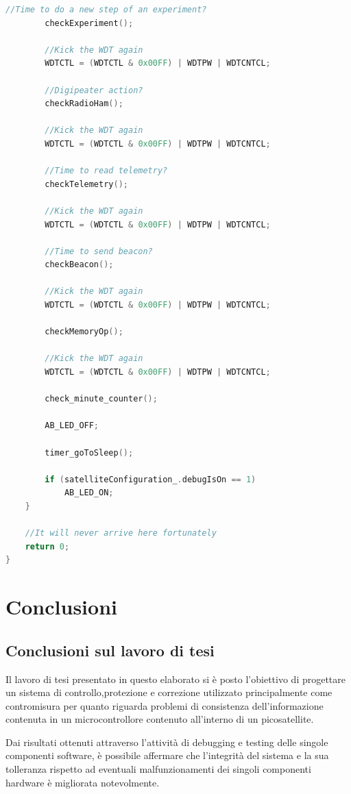 \documentclass[LaM,binding=0.6cm]{../sapthesis}
\begin{document}
\begin{small}
\begin{lstlisting}[language=C]
        //Time to do a new step of an experiment?
        checkExperiment();

        //Kick the WDT again
        WDTCTL = (WDTCTL & 0x00FF) | WDTPW | WDTCNTCL;

        //Digipeater action?
        checkRadioHam();

        //Kick the WDT again
        WDTCTL = (WDTCTL & 0x00FF) | WDTPW | WDTCNTCL;

        //Time to read telemetry?
        checkTelemetry();

        //Kick the WDT again
        WDTCTL = (WDTCTL & 0x00FF) | WDTPW | WDTCNTCL;

        //Time to send beacon?
        checkBeacon();

        //Kick the WDT again
        WDTCTL = (WDTCTL & 0x00FF) | WDTPW | WDTCNTCL;

        checkMemoryOp();

        //Kick the WDT again
        WDTCTL = (WDTCTL & 0x00FF) | WDTPW | WDTCNTCL;

        check_minute_counter();

        AB_LED_OFF;

        timer_goToSleep();

        if (satelliteConfiguration_.debugIsOn == 1)
            AB_LED_ON;
    }

    //It will never arrive here fortunately
    return 0;
}
\end{lstlisting}
\end{small}



\chapter{Conclusioni}

\section{Conclusioni sul lavoro di tesi}

Il lavoro di tesi presentato in questo elaborato si è posto l'obiettivo di progettare un sistema di controllo,protezione e correzione
utilizzato principalmente come contromisura per quanto riguarda problemi di consistenza dell'informazione contenuta in un microcontrollore contenuto all'interno di un picosatellite.

Dai risultati ottenuti attraverso l'attività di debugging e testing delle singole componenti software, è possibile affermare che l'integrità 
del sistema e la sua tolleranza rispetto ad eventuali malfunzionamenti dei singoli componenti hardware è migliorata notevolmente.
\end{document}
